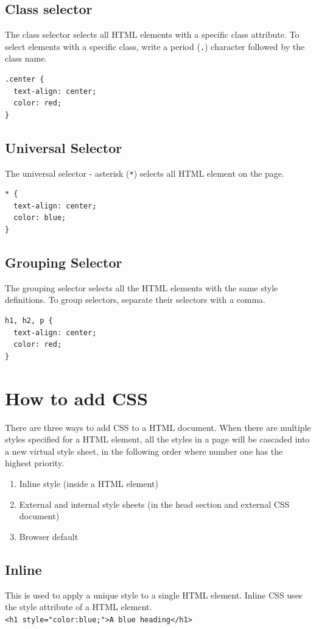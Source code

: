 \documentclass{thomasClass}
\begin{document}
\subsection{Class selector}
The class selector selects all HTML elements with a specific class attribute. To select elements with a specific class, write a period (\verb|.|) character followed by the class name.
\begin{verbatim}
.center {
  text-align: center;
  color: red;
}
\end{verbatim}
\subsection{Universal Selector}
The universal selector - asterisk (\verb|*|) selects all HTML element on the page.
\begin{verbatim}
* {
  text-align: center;
  color: blue;
}
\end{verbatim}
\subsection{Grouping Selector}
The grouping selector selects all the HTML elements with the same style definitions. To group selectors, separate their selectors with a comma.
\begin{verbatim}
h1, h2, p {
  text-align: center;
  color: red;
}
\end{verbatim}

\section{How to add CSS}
There are three ways to add CSS to a HTML document. When there are multiple styles specified for a HTML element, all the styles in a page will be cascaded into a new virtual style sheet, in the following order where number one has the highest priority.
\begin{enumerate}
    \item Inline style (inside a HTML element)
    \item External and internal style sheets (in the head section and external CSS document)
    \item Browser default
\end{enumerate} 
\subsection{Inline}
This is used to apply a unique style to a single HTML element. Inline CSS uses the style attribute of a HTML element. \\
\verb|<h1 style="color:blue;">A blue heading</h1>|
\end{document}
